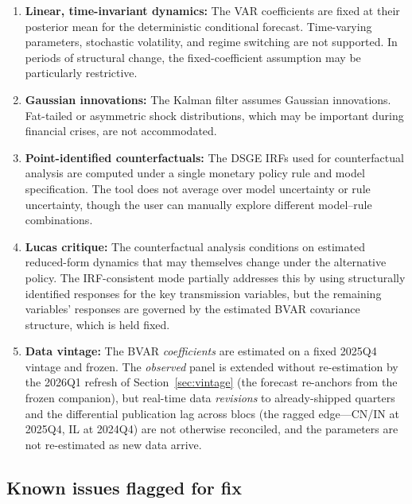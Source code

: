 \documentclass[11pt]{article}
\theoremstyle{definition}
\theoremstyle{remark}
\begin{document}
\begin{enumerate}
  \item \textbf{Linear, time-invariant dynamics:} The VAR
    coefficients are fixed at their posterior mean for the
    deterministic conditional forecast.  Time-varying parameters,
    stochastic volatility, and regime switching are not supported.
    In periods of structural change, the fixed-coefficient
    assumption may be particularly restrictive.

  \item \textbf{Gaussian innovations:} The Kalman filter assumes
    Gaussian innovations.  Fat-tailed or asymmetric shock distributions,
    which may be important during financial crises, are not accommodated.

  \item \textbf{Point-identified counterfactuals:} The DSGE IRFs
    used for counterfactual analysis are computed under a single
    monetary policy rule and model specification.  The tool does not
    average over model uncertainty or rule uncertainty, though the
    user can manually explore different model--rule combinations.

  \item \textbf{Lucas critique:} The counterfactual analysis
    conditions on estimated reduced-form dynamics that may themselves
    change under the alternative policy.  The IRF-consistent mode
    partially addresses this by using structurally identified
    responses for the key transmission variables, but the remaining
    variables' responses are governed by the estimated BVAR
    covariance structure, which is held fixed.

  \item \textbf{Data vintage:} The BVAR \emph{coefficients} are estimated
    on a fixed 2025Q4 vintage and frozen. The \emph{observed} panel is
    extended without re-estimation by the 2026Q1 refresh of
    Section~\ref{sec:vintage} (the forecast re-anchors from the frozen
    companion), but real-time data \emph{revisions} to already-shipped
    quarters and the differential publication lag across blocs (the ragged
    edge---CN/IN at 2025Q4, IL at 2024Q4) are not otherwise reconciled, and
    the parameters are not re-estimated as new data arrive.
\end{enumerate}

\subsection{Known issues flagged for fix}\label{sec:knownissues}
\end{document}
